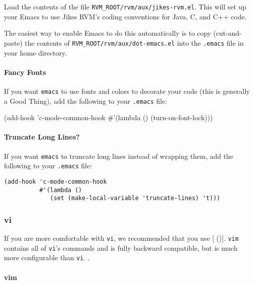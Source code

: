 Load the contents of the
file \texttt{RVM\_ROOT/rvm/aux/jikes-rvm.el}.  This will set up your
Emacs to use Jikes RVM's coding conventions for Java, C, and C++ code.

The easiest way to enable Emacs to do this automatically is to copy
(cut-and-paste) the contents
of \texttt{RVM\_ROOT/rvm/aux/dot-emacs.el} into the \texttt{.emacs}
file in your home directory.

\paragraph{Fancy Fonts}

If you want \texttt{emacs} to use fonts and colors to decorate your
code (this is generally a Good Thing), add the following to
your \texttt{.emacs} file:

\begin{example}
(add-hook 'c-mode-common-hook
	  #'(lambda ()
	      (turn-on-font-lock)))
\end{example}


\paragraph{Truncate Long Lines?}

If you want {\tt emacs} to truncate long lines instead of wrapping them, add
the following to your \texttt{.emacs} file:
\begin{verbatim}
(add-hook 'c-mode-common-hook
          #'(lambda ()
             (set (make-local-variable 'truncate-lines) 't)))
\end{verbatim}

\subsubsection{vi}\label{options:vi/vim}

If you are more comfortable with {\tt vi}, we recommended that you
use [ (\texttt{\VimURL})]{\VimURL}.
\texttt{vim}
contains all of {\tt vi}'s commands and is fully backward compatible,
but is much more configurable than {\tt vi}.  .

\paragraph{vim}\label{options:vim}


